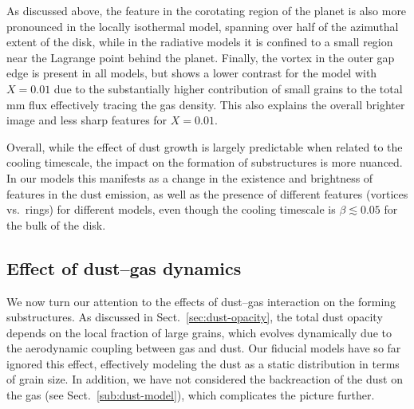 \documentclass[fleqn,usenatbib,useAMS]{mnras}
\begin{document}
As discussed above, the feature in the corotating region of the planet is also more pronounced in the locally isothermal model, spanning over half of the azimuthal extent of the disk, while in the radiative models it is confined to a small region near the Lagrange point behind the planet. Finally, the vortex in the outer gap edge is present in all models, but shows a lower contrast for the model with $X=0.01$ due to the substantially higher contribution of small grains to the total mm flux effectively tracing the gas density. This also explains the overall brighter image and less sharp features for $X=0.01$.

Overall, while the effect of dust growth is largely predictable when related to the cooling timescale, the impact on the formation of substructures is more nuanced. In our models this manifests as a change in the existence and brightness of features in the dust emission, as well as the presence of different features (vortices vs.~rings) for different models, even though the cooling timescale is $\beta\lesssim0.05$ for the bulk of the disk. 

\subsection{Effect of dust--gas dynamics}

We now turn our attention to the effects of dust--gas interaction on the forming substructures. As discussed in Sect.~\ref{sec:dust-opacity}, the total dust opacity depends on the local fraction of large grains, which evolves dynamically due to the aerodynamic coupling between gas and dust. Our fiducial models have so far ignored this effect, effectively modeling the dust as a static distribution in terms of grain size. In addition, we have not considered the backreaction of the dust on the gas (see Sect.~\ref{sub:dust-model}), which complicates the picture further.
\end{document}
